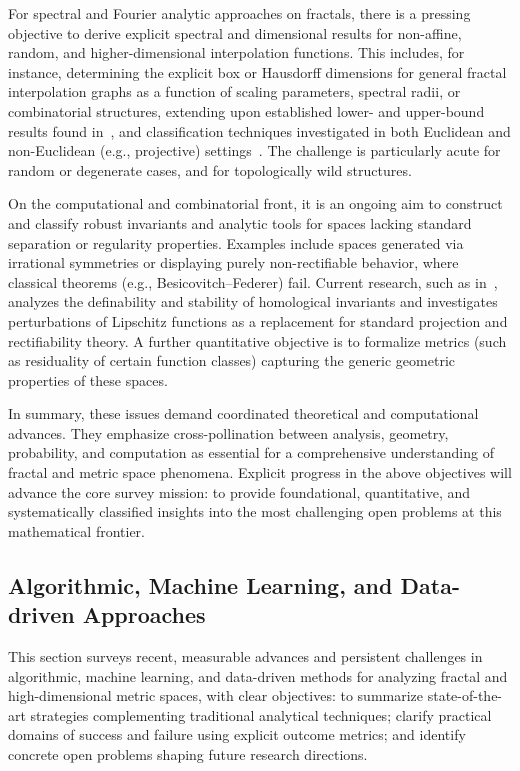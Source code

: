\documentclass[sigconf]{acmart}
\begin{document}
For spectral and Fourier analytic approaches on fractals, there is a pressing objective to derive explicit spectral and dimensional results for non-affine, random, and higher-dimensional interpolation functions. This includes, for instance, determining the explicit box or Hausdorff dimensions for general fractal interpolation graphs as a function of scaling parameters, spectral radii, or combinatorial structures, extending upon established lower- and upper-bound results found in~\cite{ref28}, and classification techniques investigated in both Euclidean and non-Euclidean (e.g., projective) settings~\cite{ref32,ref33}. The challenge is particularly acute for random or degenerate cases, and for topologically wild structures.

On the computational and combinatorial front, it is an ongoing aim to construct and classify robust invariants and analytic tools for spaces lacking standard separation or regularity properties. Examples include spaces generated via irrational symmetries or displaying purely non-rectifiable behavior, where classical theorems (e.g., Besicovitch–Federer) fail. Current research, such as in~\cite{ref20,ref43}, analyzes the definability and stability of homological invariants and investigates perturbations of Lipschitz functions as a replacement for standard projection and rectifiability theory. A further quantitative objective is to formalize metrics (such as residuality of certain function classes) capturing the generic geometric properties of these spaces.

In summary, these issues demand coordinated theoretical and computational advances. They emphasize cross-pollination between analysis, geometry, probability, and computation as essential for a comprehensive understanding of fractal and metric space phenomena. Explicit progress in the above objectives will advance the core survey mission: to provide foundational, quantitative, and systematically classified insights into the most challenging open problems at this mathematical frontier.

\subsection{Algorithmic, Machine Learning, and Data-driven Approaches}

This section surveys recent, measurable advances and persistent challenges in algorithmic, machine learning, and data-driven methods for analyzing fractal and high-dimensional metric spaces, with clear objectives: to summarize state-of-the-art strategies complementing traditional analytical techniques; clarify practical domains of success and failure using explicit outcome metrics; and identify concrete open problems shaping future research directions. 
\end{document}
